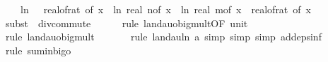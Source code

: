 \begin{isabellebody}
\ \ \ \ ln\ {\isacharparenleft}{\kern0pt}{}\ {\isacharslash}{\kern0pt}\ real{\isacharunderscore}{\kern0pt}of{\isacharunderscore}{\kern0pt}rat\ {\isacharparenleft}{\kern0pt}{\isasymepsilon}{\isacharunderscore}{\kern0pt}of\ x{\isacharparenright}{\kern0pt}{\isacharparenright}{\kern0pt}\ {\isacharasterisk}{\kern0pt}\ {\isacharparenleft}{\kern0pt}ln\ {\isacharparenleft}{\kern0pt}real\ {\isacharparenleft}{\kern0pt}n{\isacharunderscore}{\kern0pt}of\ x{\isacharparenright}{\kern0pt}{\isacharparenright}{\kern0pt}\ {\isacharplus}{\kern0pt}\ ln\ {\isacharparenleft}{\kern0pt}real\ {\isacharparenleft}{\kern0pt}m{\isacharunderscore}{\kern0pt}of\ x{\isacharparenright}{\kern0pt}{\isacharparenright}{\kern0pt}{\isacharparenright}{\kern0pt}\ {\isacharslash}{\kern0pt}\ {\isacharparenleft}{\kern0pt}real{\isacharunderscore}{\kern0pt}of{\isacharunderscore}{\kern0pt}rat\ {\isacharparenleft}{\kern0pt}{\isasymdelta}{\isacharunderscore}{\kern0pt}of\ x{\isacharparenright}{\kern0pt}{\isacharparenright}{\kern0pt}\isanewline
\ \ \ \ \isamarkupfalse%
\ {\isacharparenleft}{\kern0pt}subst\ {\isacharparenleft}{\kern0pt}{}{\isacharparenright}{\kern0pt}\ div{\isacharunderscore}{\kern0pt}commute{\isacharparenright}{\kern0pt}\isanewline
\ \ \ \ \isamarkupfalse%
\ {\isacharparenleft}{\kern0pt}rule\ landau{\isacharunderscore}{\kern0pt}o{\isachardot}{\kern0pt}big{\isacharunderscore}{\kern0pt}mult{\isacharunderscore}{\kern0pt}{}{\isacharprime}{\kern0pt}{\isacharbrackleft}{\kern0pt}OF\ unit{\isacharunderscore}{\kern0pt}{}{\isacharbrackright}{\kern0pt}{\isacharparenright}{\kern0pt}\isanewline
\ \ \ \ \isamarkupfalse%
\ {\isacharparenleft}{\kern0pt}rule\ landau{\isacharunderscore}{\kern0pt}o{\isachardot}{\kern0pt}big{\isacharunderscore}{\kern0pt}mult{\isacharunderscore}{\kern0pt}{}{\isacharparenright}{\kern0pt}\isanewline
\ \ \ \ \ \isamarkupfalse%
\ {\isacharparenleft}{\kern0pt}rule\ landau{\isacharunderscore}{\kern0pt}ln{\isacharunderscore}{\kern0pt}{}{\isacharbrackleft}{\kern0pt}\ a{\isacharequal}{\kern0pt}{\isachardoublequoteopen}{}{\isachardoublequoteclose}{\isacharbrackright}{\kern0pt}{\isacharcomma}{\kern0pt}\ simp{\isacharcomma}{\kern0pt}\ simp{\isacharcomma}{\kern0pt}\ simp\ add{\isacharcolon}{\kern0pt}eps{\isacharunderscore}{\kern0pt}inf{\isacharparenright}{\kern0pt}\isanewline
\ \ \ \ \ \isamarkupfalse%
\ {\isacharparenleft}{\kern0pt}rule\ sum{\isacharunderscore}{\kern0pt}in{\isacharunderscore}{\kern0pt}bigo{\isacharparenright}{\kern0pt}\isanewline

\end{isabellebody}
